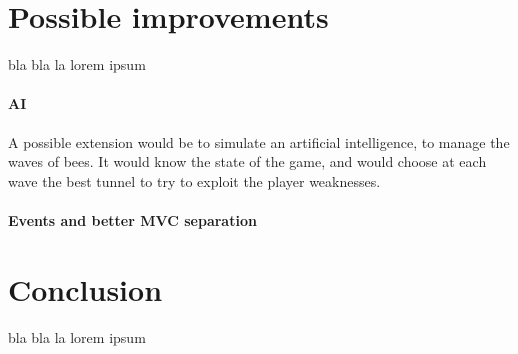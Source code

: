 \documentclass[a4paper]{article}
\begin{document}
\section{Possible improvements}
bla bla la lorem ipsum


\paragraph{AI} A possible extension would be to simulate an artificial intelligence, to manage the waves of bees. It would know the state of the game, and would choose at each wave the best tunnel to try to exploit the player weaknesses.

\paragraph{Events and better MVC separation}


\section*{Conclusion}
bla bla la lorem ipsum
\end{document}
